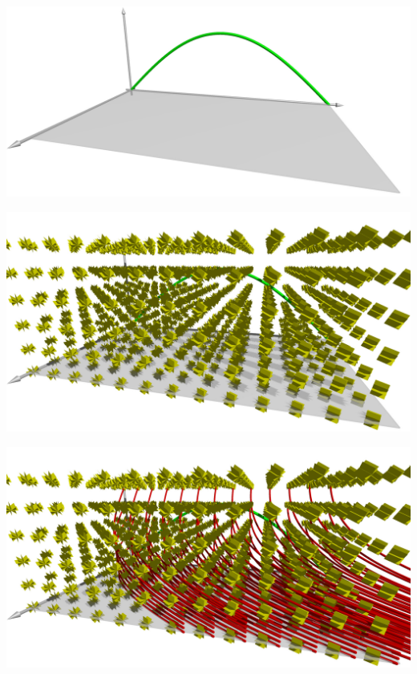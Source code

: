 \documentclass[handout]{beamer}
\begin{document}
\begin{frame}
\begin{center}
\includegraphics[width=\hsize]{../../skript/3d/cauchy.jpg}
\end{center}
\end{frame}

\begin{frame}
\begin{center}
\includegraphics[width=\hsize]{../../skript/3d/planes.jpg}
\end{center}
\end{frame}

\begin{frame}
\begin{center}
\includegraphics[width=\hsize]{../../skript/3d/chrpl.jpg}
\end{center}
\end{frame}
\end{document}
